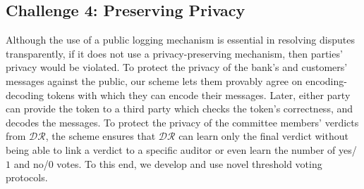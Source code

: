 \vspace{-4mm}
\subsection{Challenge 4: Preserving Privacy}
 Although the use of a public logging mechanism is essential in resolving disputes transparently, if it does not use a  privacy-preserving mechanism, then parties' privacy would be violated. To protect the privacy of the bank's and customers' messages against the public, our scheme lets them provably agree on encoding-decoding tokens with which they can  encode their messages. Later, either party can provide the token to a third party which checks the token's correctness, and decodes the messages. To protect the privacy of the committee members' verdicts from $\mathcal{DR}$, the scheme ensures that  $\mathcal{DR}$ can learn only the final verdict without being able to link a verdict to a specific auditor or even learn the number of yes/$1$ and no/$0$ votes. To this end, we develop and use novel threshold voting protocols. 
 
 
 
 